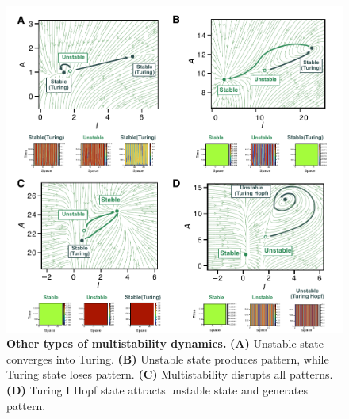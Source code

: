 \documentclass[10pt,letterpaper]{article}
\begin{document}
\begin{figure}[!h]
    \includegraphics[width=1\textwidth]{figures/multistability_leftovers}

    \caption{{\bf Other types of multistability dynamics.} \textbf{(A)} Unstable state converges into Turing. \textbf{(B)} Unstable state produces pattern, while Turing state loses pattern. \textbf{(C)} Multistability disrupts all patterns. \textbf{(D)} Turing I Hopf state attracts unstable state and generates pattern.}

    \label{sup_fig4}
\end{figure}
\end{document}
